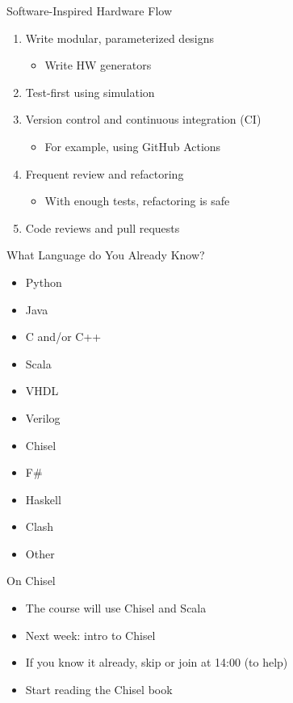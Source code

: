 \begin{frame}{Software-Inspired Hardware Flow}
\begin{enumerate}
    \item Write modular, parameterized designs
    \begin{itemize}
\item Write HW generators
\end{itemize}
    \item Test-first using simulation
    \item Version control and continuous integration (CI)
    \begin{itemize}
\item For example, using GitHub Actions
\end{itemize}
    \item Frequent review and refactoring
    \begin{itemize}
\item With enough tests, refactoring is safe
\end{itemize}
    \item Code reviews and pull requests
\end{enumerate}
\end{frame}


\begin{frame}[fragile]{What Language do You Already Know?}
\begin{itemize}
\item Python
\item Java
\item C and/or C++
\item Scala
\item VHDL
\item Verilog
\item Chisel
\item F\#
\item Haskell
\item Clash
\item Other
\end{itemize}
\end{frame}

\begin{frame}[fragile]{On Chisel}
\begin{itemize}
\item The course will use Chisel and Scala
\item Next week: intro to Chisel
\item If you know it already, skip or join at 14:00 (to help)
\item Start reading the Chisel book
\end{itemize}
\end{frame}

